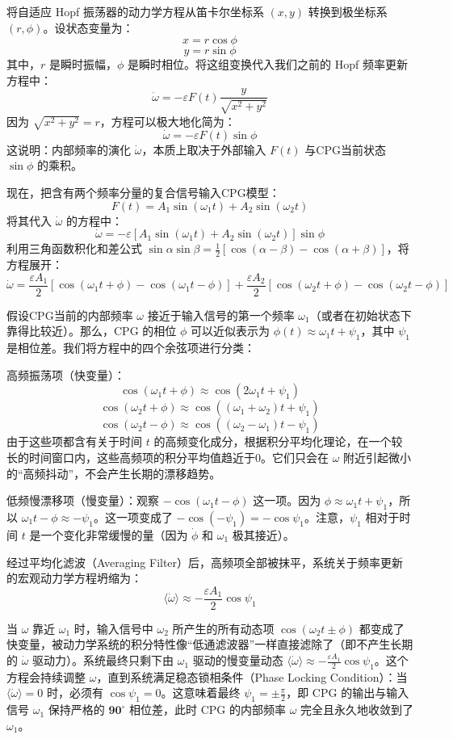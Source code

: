 \documentclass[12pt, a4paper]{ctexart}
\begin{document}
将自适应 Hopf 振荡器的动力学方程从笛卡尔坐标系 $(x, y)$ 转换到极坐标系 $(r, \phi)$。设状态变量为：$$x = r \cos\phi$$$$y = r \sin\phi$$其中，$r$ 是瞬时振幅，$\phi$ 是瞬时相位。将这组变换代入我们之前的 Hopf 频率更新方程中：$$\dot{\omega} = -\varepsilon F(t) \frac{y}{\sqrt{x^2 + y^2}}$$因为 $\sqrt{x^2 + y^2} = r$，方程可以极大地化简为：$$\dot{\omega} = -\varepsilon F(t) \sin\phi$$这说明：内部频率的演化 $\dot{\omega}$，本质上取决于外部输入 $F(t)$ 与CPG当前状态 $\sin\phi$ 的乘积。

现在，把含有两个频率分量的复合信号输入CPG模型：$$F(t) = A_1 \sin(\omega_1 t) + A_2 \sin(\omega_2 t)$$将其代入 $\dot{\omega}$ 的方程中：$$\dot{\omega} = -\varepsilon [A_1 \sin(\omega_1 t) + A_2 \sin(\omega_2 t)] \sin\phi$$利用三角函数积化和差公式 $\sin\alpha \sin\beta = \frac{1}{2}[\cos(\alpha - \beta) - \cos(\alpha + \beta)]$，将方程展开：$$\dot{\omega} = \frac{\varepsilon A_1}{2} [\cos(\omega_1 t + \phi) - \cos(\omega_1 t - \phi)] + \frac{\varepsilon A_2}{2} [\cos(\omega_2 t + \phi) - \cos(\omega_2 t - \phi)]$$

假设CPG当前的内部频率 $\omega$ 接近于输入信号的第一个频率 $\omega_1$（或者在初始状态下靠得比较近）。那么，CPG 的相位 $\phi$ 可以近似表示为 $\phi(t) \approx \omega_1 t + \psi_1$，其中 $\psi_1$ 是相位差。我们将方程中的四个余弦项进行分类：

高频振荡项（快变量）：$$\cos(\omega_1 t + \phi) \approx \cos(2\omega_1 t + \psi_1)$$$$\cos(\omega_2 t + \phi) \approx \cos((\omega_1 + \omega_2)t + \psi_1)$$$$\cos(\omega_2 t - \phi) \approx \cos((\omega_2 - \omega_1)t - \psi_1)$$
由于这些项都含有关于时间 $t$ 的高频变化成分，根据积分平均化理论，在一个较长的时间窗口内，这些高频项的积分平均值趋近于0。它们只会在 $\omega$ 附近引起微小的“高频抖动”，不会产生长期的漂移趋势。

低频慢漂移项（慢变量）：观察 $-\cos(\omega_1 t - \phi)$ 这一项。因为 $\phi \approx \omega_1 t + \psi_1$，所以 $\omega_1 t - \phi \approx -\psi_1$。这一项变成了 $-\cos(-\psi_1) = -\cos\psi_1$。注意，$\psi_1$ 相对于时间 $t$ 是一个变化非常缓慢的量（因为 $\dot{\phi}$ 和 $\omega_1$ 极其接近）。

经过平均化滤波（Averaging Filter）后，高频项全部被抹平，系统关于频率更新的宏观动力学方程坍缩为：$$\langle \dot{\omega} \rangle \approx -\frac{\varepsilon A_1}{2} \cos\psi_1$$

当 $\omega$ 靠近 $\omega_1$ 时，输入信号中 $\omega_2$ 所产生的所有动态项 $\cos(\omega_2 t \pm \phi)$ 都变成了快变量，被动力学系统的积分特性像“低通滤波器”一样直接滤除了（即不产生长期的 $\dot{\omega}$ 驱动力）。系统最终只剩下由 $\omega_1$ 驱动的慢变量动态 $\langle \dot{\omega} \rangle \approx -\frac{\varepsilon A_1}{2} \cos\psi_1$。这个方程会持续调整 $\omega$，直到系统满足稳态锁相条件（Phase Locking Condition）：当 $\langle \dot{\omega} \rangle = 0$ 时，必须有 $\cos\psi_1 = 0$。这意味着最终 $\psi_1 = \pm \frac{\pi}{2}$，即 CPG 的输出与输入信号 $\omega_1$ 保持严格的 $\mathbf{90^\circ}$ 相位差，此时 CPG 的内部频率 $\omega$ 完全且永久地收敛到了 $\omega_1$。
\end{document}
